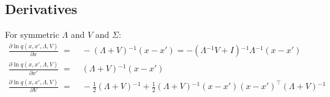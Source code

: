 \documentclass{article}
\newcommand{\inv}{{^{-1}}}
\begin{document}
\subsection*{Derivatives}

For symmetric $\Lambda$ and $V$ and $\Sigma$:
\begin{equation}
\begin{split}
\frac{\partial \ln q(x,x',\Lambda,V)}{\partial x} 
\;=&\; -(\Lambda+V)\inv (x-x') = -(\Lambda\inv V+I)\inv\Lambda\inv (x-x') \\
\frac{\partial \ln q(x,x',\Lambda,V)}{\partial x'} 
\;=&\; (\Lambda+V)\inv (x-x') \\
\frac{\partial \ln q(x,x',\Lambda,V)}{\partial V}
\;=&\; -\frac{1}{2}(\Lambda+V)\inv + \frac{1}{2}(\Lambda+V)\inv(x-x')(x-x')^\top(\Lambda+V)\inv
\end{split}
\end{equation}
\end{document}
